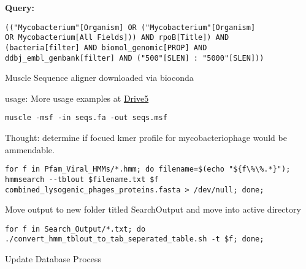 \documentclass[idxtotoc,hyperref,openany]{labbook} %
\begin{document}

\textbf{Query:}
\begin{verbatim}
(("Mycobacterium"[Organism] OR ("Mycobacterium"[Organism] 
OR Mycobacterium[All Fields])) AND rpoB[Title]) AND 
(bacteria[filter] AND biomol_genomic[PROP] AND 
ddbj_embl_genbank[filter] AND ("500"[SLEN] : "5000"[SLEN]))
\end{verbatim}

Muscle Sequence aligner downloaded via bioconda

usage:
More usage examples at \href{http://www.drive5.com/muscle/muscle.html}{Drive5}


\begin{verbatim}
muscle -msf -in seqs.fa -out seqs.msf
\end{verbatim}





Thought: determine if focued kmer profile for mycobacteriophage would be ammendable.

\begin{verbatim}
for f in Pfam_Viral_HMMs/*.hmm; do filename=$(echo "${f\%\%.*}"); hmmsearch --tblout $filename.txt $f combined_lysogenic_phages_proteins.fasta > /dev/null; done;
\end{verbatim}

Move output to new folder titled SearchOutput and move into active directory

\begin{verbatim}
for f in Search_Output/*.txt; do ./convert_hmm_tblout_to_tab_seperated_table.sh -t $f; done;
\end{verbatim}







Update Database Process
\end{document}
